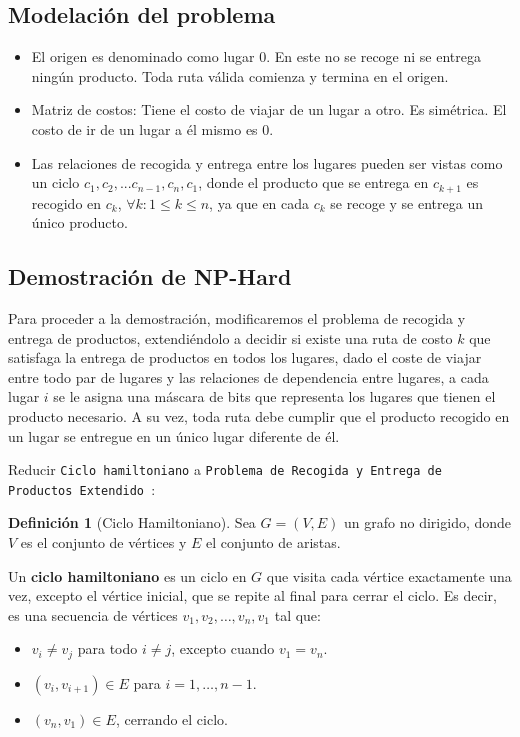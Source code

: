 \documentclass[twocolumn, fontsize=10pt]{article}
\theoremstyle{definition} %
\newtheorem{definition}{Definición} %
\begin{document}
\subsection{Modelación del problema}
\begin{itemize}
    \item El origen es denominado como lugar \(0\). En este no se recoge ni se entrega ningún producto. Toda ruta válida comienza y termina en el origen.
    \item Matriz de costos: Tiene el costo de viajar de un lugar a otro. Es simétrica. El costo de ir de un lugar a él mismo es \(0\).
    \item Las relaciones de recogida y entrega entre los lugares pueden ser vistas como un ciclo \(c_1,c_2,...c_{n-1},c_n,c_1\), donde el producto que se entrega en \(c_{k+1}\) es recogido en \(c_k\), \(\forall k: 1 \leq k \leq n\), ya que en cada \(c_k\) se recoge y se entrega un único producto. 
 
\end{itemize}

\subsection{Demostración de NP-Hard}
Para proceder a la demostración, modificaremos el problema de recogida y entrega de productos, extendiéndolo a decidir si existe una ruta de costo \(k\) que satisfaga la entrega de productos en todos los lugares, dado el coste de viajar entre todo par de lugares y las relaciones de dependencia entre lugares, a cada lugar \(i\) se le asigna una máscara de bits que representa los lugares que tienen el producto necesario. A su vez, toda ruta debe cumplir que el producto recogido en un lugar se entregue en un único lugar diferente de él.

Reducir \texttt{Ciclo hamiltoniano} a \texttt{Problema de Recogida y Entrega de Productos Extendido }:

\begin{definition}[Ciclo Hamiltoniano]
    Sea \( G = (V, E) \) un grafo no dirigido, donde \( V \) es el conjunto de vértices y \( E \) el conjunto de aristas.  

    Un \textbf{ciclo hamiltoniano}  es un ciclo en \( G \) que visita cada vértice exactamente una vez, excepto el vértice inicial, que se repite al final para cerrar el ciclo. Es decir, es una secuencia de vértices \( v_1, v_2, \dots, v_n, v_1 \) tal que:  
    \begin{itemize}
        \item \( v_i \neq v_j \) para todo \( i \neq j \), excepto cuando \( v_1 = v_n \).
        \item \( (v_i, v_{i+1}) \in E \) para \( i = 1, \dots, n-1 \).
        \item \( (v_n, v_1) \in E \), cerrando el ciclo.
    \end{itemize}
\end{definition}
\end{document}

